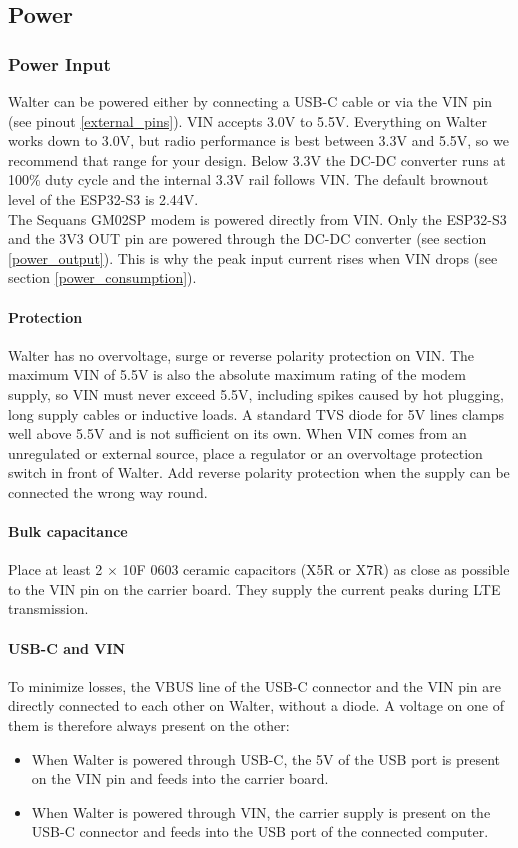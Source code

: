 \documentclass[11pt]{article}
\begin{document}
\subsection{Power} \label{power}
\subsubsection{Power Input} \label{power_input}
Walter can be powered either by connecting a USB-C cable or via the VIN pin (see pinout \ref{external_pins}). VIN accepts 3.0V to 5.5V. Everything on Walter works down to 3.0V, but radio performance is best between 3.3V and 5.5V, so we recommend that range for your design. Below 3.3V the DC-DC converter runs at 100\% duty cycle and the internal 3.3V rail follows VIN. The default brownout level of the ESP32-S3 is 2.44V.\\

The Sequans GM02SP modem is powered directly from VIN. Only the ESP32-S3 and the 3V3 OUT pin are powered through the DC-DC converter (see section \ref{power_output}). This is why the peak input current rises when VIN drops (see section \ref{power_consumption}).

\paragraph{Protection}
Walter has no overvoltage, surge or reverse polarity protection on VIN. The maximum VIN of 5.5V is also the absolute maximum rating of the modem supply, so VIN must never exceed 5.5V, including spikes caused by hot plugging, long supply cables or inductive loads. A standard TVS diode for 5V lines clamps well above 5.5V and is not sufficient on its own. When VIN comes from an unregulated or external source, place a regulator or an overvoltage protection switch in front of Walter. Add reverse polarity protection when the supply can be connected the wrong way round.

\paragraph{Bulk capacitance}
Place at least 2 $\times$ 10\textmu F 0603 ceramic capacitors (X5R or X7R) as close as possible to the VIN pin on the carrier board. They supply the current peaks during LTE transmission.

\paragraph{USB-C and VIN}
To minimize losses, the VBUS line of the USB-C connector and the VIN pin are directly connected to each other on Walter, without a diode. A voltage on one of them is therefore always present on the other:
\begin{itemize}
	\item When Walter is powered through USB-C, the 5V of the USB port is present on the VIN pin and feeds into the carrier board.
	\item When Walter is powered through VIN, the carrier supply is present on the USB-C connector and feeds into the USB port of the connected computer.
\end{itemize}
\end{document}
